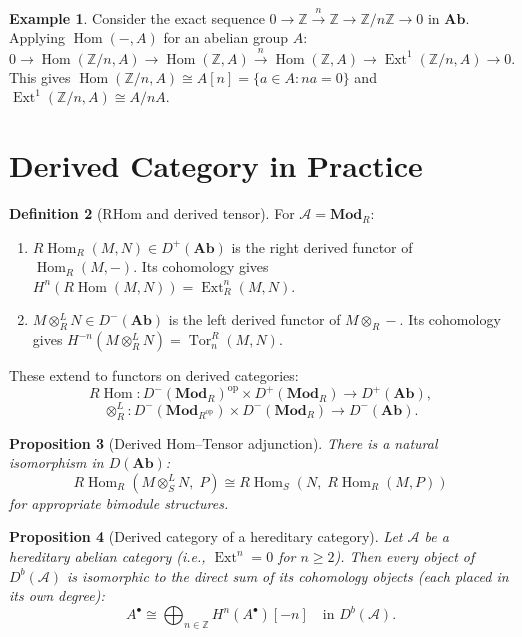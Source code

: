 \documentclass[a4paper,12pt]{book}
\DeclareMathOperator{\Hom}{Hom}
\newcommand{\Ab}{\mathbf{Ab}}
\newcommand{\Mod}{\mathbf{Mod}}
\newcommand{\op}{\mathrm{op}}
\theoremstyle{definition}
\newtheorem{definition}{Definition}[section]
\newtheorem{example}[definition]{Example}
\theoremstyle{plain}
\newtheorem{proposition}[definition]{Proposition}
\theoremstyle{remark}
\begin{document}
\begin{example}\label{ex:les-application}
Consider the exact sequence $0 \to \mathbb{Z} \xrightarrow{n} \mathbb{Z} \to \mathbb{Z}/n\mathbb{Z} \to 0$
in $\Ab$. Applying $\Hom(-, A)$ for an abelian group $A$:
\[
    0 \to \Hom(\mathbb{Z}/n, A) \to \Hom(\mathbb{Z}, A) \xrightarrow{n}
    \Hom(\mathbb{Z}, A) \to \operatorname{Ext}^1(\mathbb{Z}/n, A) \to 0.
\]
This gives $\Hom(\mathbb{Z}/n, A) \cong A[n] = \{a \in A : na = 0\}$ and
$\operatorname{Ext}^1(\mathbb{Z}/n, A) \cong A/nA$.
\end{example}


\section{Derived Category in Practice}\label{sec:derived-practice}

\begin{definition}[RHom and derived tensor]\label{def:rhom-ltensor}
For $\mathcal{A} = \Mod_R$:
\begin{enumerate}
    \item $R\Hom_R(M, N) \in D^+(\Ab)$ is the right derived functor of $\Hom_R(M, -)$.
    Its cohomology gives $H^n(R\Hom(M, N)) = \operatorname{Ext}^n_R(M, N)$.
    \item $M \otimes_R^L N \in D^-(\Ab)$ is the left derived functor of $M \otimes_R -$.
    Its cohomology gives $H^{-n}(M \otimes_R^L N) = \operatorname{Tor}_n^R(M, N)$.
\end{enumerate}
These extend to functors on derived categories:
\[
    R\Hom \colon D^-(\Mod_R)^{\op} \times D^+(\Mod_R) \to D^+(\Ab),
\]
\[
    \otimes_R^L \colon D^-(\Mod_{R^{\op}}) \times D^-(\Mod_R) \to D^-(\Ab).
\]
\end{definition}

\begin{proposition}[Derived Hom--Tensor adjunction]\label{prop:derived-adjunction}
There is a natural isomorphism in $D(\Ab)$:
\[
    R\Hom_R(M \otimes_S^L N, \; P) \cong R\Hom_S(N, \; R\Hom_R(M, P))
\]
for appropriate bimodule structures.
\end{proposition}

\begin{proposition}[Derived category of a hereditary category]\label{prop:hereditary-derived}
Let $\mathcal{A}$ be a hereditary abelian category (i.e., $\operatorname{Ext}^n = 0$ for $n \geq 2$).
Then every object of $D^b(\mathcal{A})$ is isomorphic to the direct sum of its cohomology
objects (each placed in its own degree):
\[
    A^\bullet \cong \bigoplus_{n \in \mathbb{Z}} H^n(A^\bullet)[-n] \quad \text{in } D^b(\mathcal{A}).
\]
\end{proposition}
\end{document}
